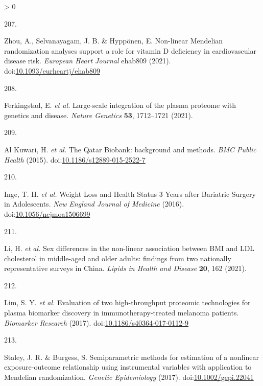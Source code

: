 \documentclass[11pt,twoside]{bristolthesis}
\newlength{\cslhangindent}
\newlength{\csllabelwidth}
\newenvironment{CSLReferences}[2] %
 {%
  \setlength{\parindent}{0pt}
  \ifodd #1 \everypar{\setlength{\hangindent}{\cslhangindent}}\ignorespaces\fi
  \ifnum #2 > 0
  \setlength{\parskip}{#2\baselineskip}
  \fi
 }%
 {}
\newcommand{\CSLLeftMargin}[1]{\parbox[t]{\csllabelwidth}{#1}}
\newcommand{\CSLRightInline}[1]{\parbox[t]{\linewidth - \csllabelwidth}{#1}\break}
\begin{document}
\begin{CSLReferences}{0}{0}
\leavevmode\hypertarget{ref-Zhou2021}{}%
\CSLLeftMargin{207. }
\CSLRightInline{Zhou, A., Selvanayagam, J. B. \& Hyppönen, E. {Non-linear Mendelian randomization analyses support a role for vitamin D deficiency in cardiovascular disease risk}. \emph{European Heart Journal} ehab809 (2021). doi:\href{https://doi.org/10.1093/eurheartj/ehab809}{10.1093/eurheartj/ehab809}}

\leavevmode\hypertarget{ref-Ferkingstad2021}{}%
\CSLLeftMargin{208. }
\CSLRightInline{Ferkingstad, E. \emph{et al.} {Large-scale integration of the plasma proteome with genetics and disease}. \emph{Nature Genetics} \textbf{53}, 1712--1721 (2021).}

\leavevmode\hypertarget{ref-AlKuwari2015}{}%
\CSLLeftMargin{209. }
\CSLRightInline{Al Kuwari, H. \emph{et al.} {The Qatar Biobank: background and methods}. \emph{BMC Public Health} (2015). doi:\href{https://doi.org/10.1186/s12889-015-2522-7}{10.1186/s12889-015-2522-7}}

\leavevmode\hypertarget{ref-Inge2016}{}%
\CSLLeftMargin{210. }
\CSLRightInline{Inge, T. H. \emph{et al.} {Weight Loss and Health Status 3 Years after Bariatric Surgery in Adolescents}. \emph{New England Journal of Medicine} (2016). doi:\href{https://doi.org/10.1056/nejmoa1506699}{10.1056/nejmoa1506699}}

\leavevmode\hypertarget{ref-Li2021}{}%
\CSLLeftMargin{211. }
\CSLRightInline{Li, H. \emph{et al.} {Sex differences in the non-linear association between BMI and LDL cholesterol in middle-aged and older adults: findings from two nationally representative surveys in China}. \emph{Lipids in Health and Disease} \textbf{20}, 162 (2021).}

\leavevmode\hypertarget{ref-Lim2017}{}%
\CSLLeftMargin{212. }
\CSLRightInline{Lim, S. Y. \emph{et al.} {Evaluation of two high-throughput proteomic technologies for plasma biomarker discovery in immunotherapy-treated melanoma patients}. \emph{Biomarker Research} (2017). doi:\href{https://doi.org/10.1186/s40364-017-0112-9}{10.1186/s40364-017-0112-9}}

\leavevmode\hypertarget{ref-Staley2017}{}%
\CSLLeftMargin{213. }
\CSLRightInline{Staley, J. R. \& Burgess, S. {Semiparametric methods for estimation of a nonlinear exposure-outcome relationship using instrumental variables with application to Mendelian randomization}. \emph{Genetic Epidemiology} (2017). doi:\href{https://doi.org/10.1002/gepi.22041}{10.1002/gepi.22041}}

\end{CSLReferences}
\end{document}
